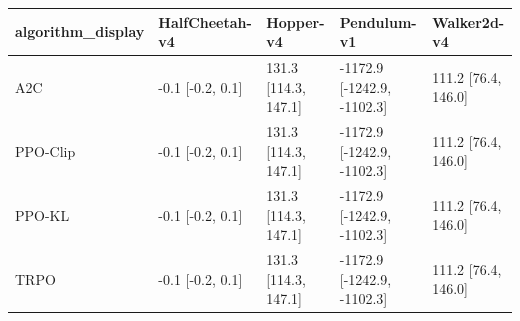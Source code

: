 \begin{tabular}{lllll}
\toprule
algorithm_display & HalfCheetah-v4 & Hopper-v4 & Pendulum-v1 & Walker2d-v4 \\
\midrule
A2C & -0.1 [-0.2, 0.1] & 131.3 [114.3, 147.1] & -1172.9 [-1242.9, -1102.3] & 111.2 [76.4, 146.0] \\
PPO-Clip & -0.1 [-0.2, 0.1] & 131.3 [114.3, 147.1] & -1172.9 [-1242.9, -1102.3] & 111.2 [76.4, 146.0] \\
PPO-KL & -0.1 [-0.2, 0.1] & 131.3 [114.3, 147.1] & -1172.9 [-1242.9, -1102.3] & 111.2 [76.4, 146.0] \\
TRPO & -0.1 [-0.2, 0.1] & 131.3 [114.3, 147.1] & -1172.9 [-1242.9, -1102.3] & 111.2 [76.4, 146.0] \\
\bottomrule
\end{tabular}
